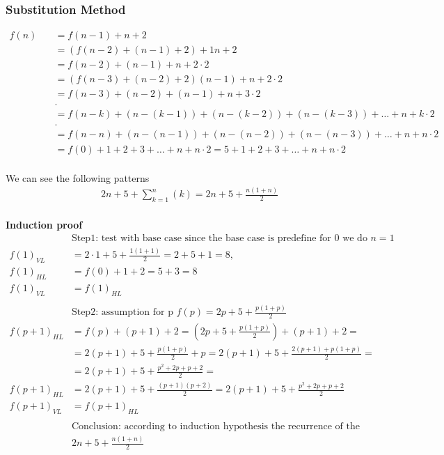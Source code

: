 \subsubsection{Substitution Method}
\begin{align*}
  f(n) &\quad = f(n-1) + n + 2  \\
  &\quad = (f(n-2) + (n-1) + 2) +1n +2 \\               &\quad = f(n-2) + (n-1) + n +2 \cdot 2 \\
  &\quad = (f(n-3) + (n-2) + 2) (n-1) + n +2 \cdot 2 \\ &\quad = f(n-3) +(n-2) + (n-1) + n +3 \cdot 2 \\
  &\quad . \\
  &\quad = f(n-k) + (n -(k-1)) + (n -(k-2)) + (n -(k-3)) + \ldots + n +k \cdot 2  \\
  &\quad . \\
  &\quad = f(n-n) + (n -(n-1)) + (n -(n-2)) + (n -(n-3)) + \ldots + n +n \cdot 2 \\
  &\quad = f(0) +1 +2 +3 + \ldots + n +n \cdot 2 = 5 +1 +2 +3 + \ldots + n +n \cdot 2\\
\end{align*}

We can see the following patterns
\begin{align*}
  &\quad 2n + 5 + \displaystyle\sum_{k=1}^{n}(k) = 2n + 5 + \frac{n(1+n)}{2} \\
\end{align*}

\noindent\textbf{Induction proof}
\begin{align*}
  &\text{Step1: test with base case since the base case is predefine for 0 we do } n=1  \\
  {f(1)}_{VL} &= 2 \cdot 1 + 5 + \frac{1(1+1)}{2} = 2 +5 +1 = 8, \\
  {f(1)}_{HL} &= f(0) + 1 +2 = 5 +3 = 8 \\
  {f(1)}_{VL} &= {f(1)}_{HL} \\
  &\\
  &\text{Step2: assumption for p } f(p) = 2p + 5 + \frac{p(1+p)}{2} \\
  {f(p+1)}_{HL} &= f(p) +(p+1) +2 = (2p +5 +\frac{p(1+p)}{2}) + (p+1) + 2 = \\
  &= 2(p+1) +5 +\frac{p(1+p)}{2} +p = 2(p+1) +5 +\frac{2(p+1)+p(1+p)}{2} = \\
  &= 2(p+1) +5 +\frac{p^2 +2p +p +2}{2} = \\
  {f(p+1)}_{HL} &= 2(p+1) + 5 + \frac{(p+1)(p+2)}{2} = 2(p+1) + 5 + \frac{p^2 +2p +p +2}{2}  \\
  {f(p+1)}_{VL} &= {f(p+1)}_{HL} \\
  &\\
  &\text{Conclusion: according to induction hypothesis the recurrence of the function is equal to } \\
  &2n + 5 + \frac{n(1+n)}{2} 
\end{align*}


